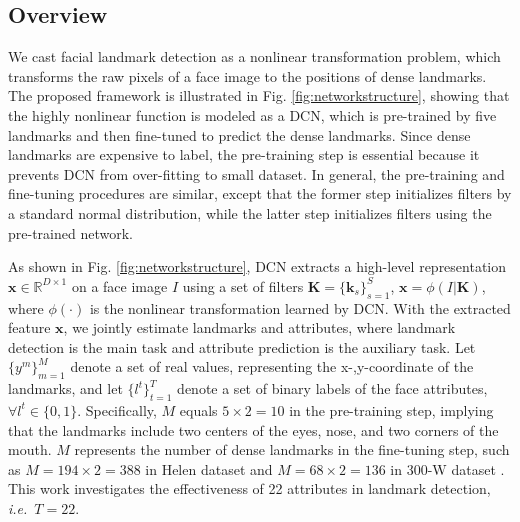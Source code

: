\documentclass[10pt,journal,compsoc]{IEEEtran}
\newcommand{\x} {\textbf{x}}
\newcommand{\kk} {\textbf{k}}
\newcommand{\ie}{\emph{i.e.}~}
\begin{document}
\subsection{Overview}
\label{sec:overview}

We cast facial landmark detection as a nonlinear transformation problem, which transforms the raw pixels of a face image to the positions of dense landmarks.
The proposed framework is illustrated in Fig. \ref{fig:networkstructure},
showing that the highly nonlinear function is modeled as a DCN, which is pre-trained by five landmarks and then fine-tuned to predict the dense landmarks.
Since dense landmarks are expensive to label, the pre-training step is essential because it prevents DCN from over-fitting to small dataset.
In general, the pre-training and fine-tuning procedures are similar, except that the former step initializes filters by a standard normal distribution, while the latter step initializes filters using the pre-trained network.

As shown in Fig. \ref{fig:networkstructure}, DCN extracts a high-level representation $\x\in\mathbb{R}^{D\times1}$ on a face image $I$ using a set of filters $\textbf{K}=\{\kk_s\}_{s=1}^S$, $\x=\phi(I|\textbf{K})$, where $\phi(\cdot)$ is the nonlinear transformation learned by DCN.
With the extracted feature $\x$, we jointly estimate landmarks and attributes, where landmark detection is the main task and attribute prediction is the auxiliary task.
Let $\{y^m\}_{m=1}^M$ denote a set of real values, representing the x-,y-coordinate of the landmarks, and let $\{l^t\}_{t=1}^T$ denote a set of binary labels of the face attributes, $\forall l^t\in\{0,1\}$.
Specifically, $M$ equals $5\times2=10$ in the pre-training step, implying that the landmarks include two centers of the eyes, nose, and two corners of the mouth.
$M$ represents the number of dense landmarks in the fine-tuning step, such as $M=194\times2=388$ in Helen dataset \cite{Helen} and $M=68\times2=136$ in 300-W dataset \cite{300w}.
This work investigates the effectiveness of 22 attributes in landmark detection, \ie$T=22$.
\end{document}
